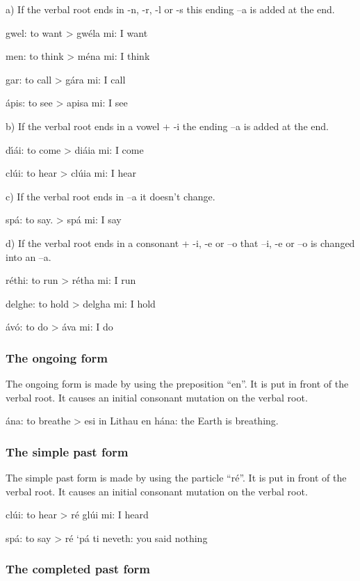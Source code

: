 a) If the verbal root ends in -n, -r, -l or -s this ending –a is added at the end.

gwel: to want
> gw\'{e}la mi: I want

men: to think
> m\'{e}na mi: I think

gar: to call
> g\'{a}ra mi: I call

\'{a}pis: to see
> apisa mi: I see

b) If the verbal root ends in a vowel + -i the ending –a is added at the end.

d\'{\i}\'{a}i: to come
> di\'{a}ia mi: I come

cl\'{u}i: to hear
> cl\'{u}ia mi: I hear

c) If the verbal root ends in –a it doesn’t change.

sp\'{a}: to say.
> sp\'{a} mi: I say

d) If the verbal root ends in a consonant + -i, -e or –o that –i, -e or –o is changed into an –a.

r\'{e}thi: to run
> r\'{e}tha mi: I run

delghe: to hold
> delgha mi: I hold

\'{a}v\'{o}: to do
> \'{a}va mi: I do

\subsubsection{The ongoing form}

The ongoing form is made by using the preposition “en”. It is put in front of the verbal root. It causes an initial consonant mutation on the verbal root.

\'{a}na: to breathe
> esi in Lithau en h\'{a}na: the Earth is breathing.

\subsubsection{The simple past form}

The simple past form is made by using the particle “r\'{e}”. It is put in front of the verbal root. It causes an initial consonant mutation on the verbal root.

cl\'{u}i: to hear
> r\'{e} gl\'{u}i mi: I heard

sp\'{a}: to say
> r\'{e} ‘p\'{a} ti neveth: you said nothing

\subsubsection{The completed past form}

